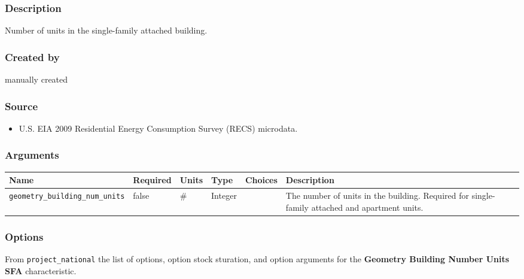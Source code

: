 \subsubsection{Description}\label{description-48}

Number of units in the single-family attached building.

\subsubsection{Created by}\label{created-by-48}

manually created

\subsubsection{Source}\label{source-47}

\begin{itemize}
 
\item
  U.S. EIA 2009 Residential Energy Consumption Survey (RECS) microdata.
\end{itemize}

\subsubsection{Arguments}\label{arguments-32}

\begin{longtable}[]{@{}llllll@{}}
\toprule\noalign{}
Name & Required & Units & Type & Choices & Description \\
\midrule\noalign{}
\endhead
\bottomrule\noalign{}
\endlastfoot
\texttt{geometry\_building\_num\_units} & false & \# & Integer & & The
number of units in the building. Required for single-family attached and
apartment units. \\
\end{longtable}

\subsubsection{Options}\label{options-48}

From \texttt{project\_national} the list of options, option stock
sturation, and option arguments for the \textbf{Geometry Building Number
Units SFA} characteristic.

